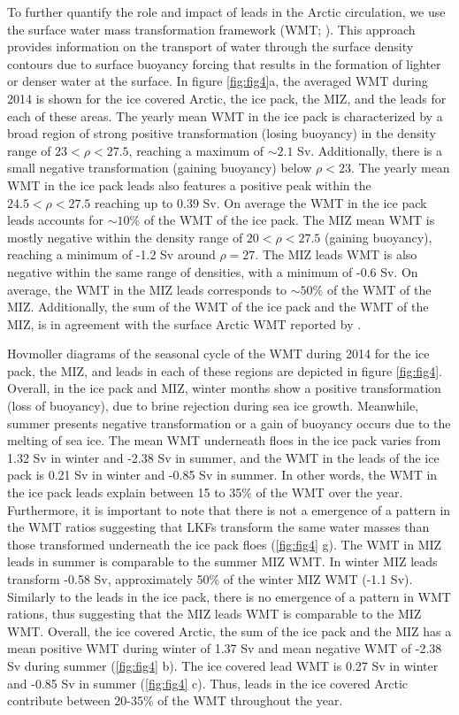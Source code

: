 \documentclass[draft]{agujournal2019}
\begin{document}
To further quantify the role and impact of leads in the Arctic circulation, we use the surface water mass transformation framework (WMT; \citealp{Walin_WMT_1982}). This approach provides information on the transport of water through the surface density contours due to surface buoyancy forcing that results in the   formation of lighter or denser water at the surface.
In figure \ref{fig:fig4}a, the averaged WMT during 2014 is shown for the ice covered Arctic, the ice pack, the MIZ, and the leads for each of these areas.
The yearly mean WMT in the ice pack is characterized by a broad region of strong positive transformation (losing buoyancy) in the density range of $23 < \rho <27.5$, reaching a maximum of $\sim 2.1$ Sv. Additionally, there is a small negative transformation (gaining buoyancy) below $\rho < 23$. 
The yearly mean WMT in the ice pack leads also features a positive peak within the $24.5 < \rho <27.5$ reaching up to 0.39 Sv. On average the WMT in the ice pack leads accounts for $\sim 10\%$ of the WMT of the ice pack. The MIZ mean WMT is mostly negative within the density range of $20 < \rho < 27.5$ (gaining buoyancy), reaching a minimum of -1.2 Sv around $\rho = 27$.  The MIZ leads WMT is also negative within the same range of densities, with a minimum of -0.6 Sv. On average, the WMT in the MIZ leads corresponds to $\sim 50\%$ of the WMT of the MIZ. Additionally, the sum of the WMT of the ice pack and the WMT of the MIZ, is in agreement with the surface Arctic WMT reported by \citet{Pemberton_WMT_2015}.

Hovmoller diagrams of the seasonal cycle of the WMT during 2014 for the ice pack, the MIZ, and leads in each of these regions are depicted in figure \ref{fig:fig4}.
Overall, in the ice pack and MIZ, winter months show a positive transformation (loss of buoyancy), due to brine rejection during sea ice growth. Meanwhile, summer presents negative transformation or a gain of buoyancy occurs due to the melting of sea ice.  
The mean WMT underneath floes in the ice pack varies from 1.32 Sv in winter and -2.38 Sv in summer, and the WMT in the leads of the ice pack is 0.21 Sv in winter and -0.85 Sv in summer. In other words, the WMT in the ice pack leads explain between 15 to 35\% of the WMT over the year. Furthermore, it is important to note that there is not a emergence of a pattern in the WMT ratios suggesting that LKFs transform the same water masses than those transformed underneath the ice pack floes (\ref{fig:fig4} g). The WMT in MIZ leads in summer is comparable to the summer MIZ WMT.  In winter MIZ leads transform -0.58 Sv, approximately 50\% of the winter MIZ WMT (-1.1 Sv). Similarly to the leads in the ice pack, there is no emergence of a pattern in WMT rations, thus suggesting that the MIZ leads WMT is comparable to the MIZ WMT. 
Overall, the ice covered Arctic, the sum of the ice pack and the MIZ has a mean positive WMT during winter of 1.37 Sv and mean negative WMT of -2.38 Sv during summer (\ref{fig:fig4} b). 
The ice covered lead WMT is 0.27 Sv in winter and -0.85 Sv in summer (\ref{fig:fig4} c). Thus, leads in the ice covered Arctic contribute between 20-35\% of the WMT throughout the year. 
\end{document}
